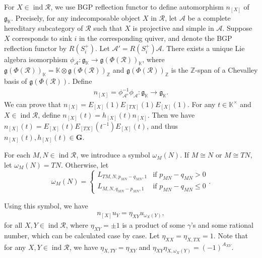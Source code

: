 \documentclass[12pt]{amsart}
\begin{document}
For $X\in \operatorname{ind}\mathcal{R}$, we use BGP reflection functor to define automorphism $n_{[X]}$ of $\mathfrak{g}_{\mathbb{K}}$. 
Precisely, for any indecomposable object $X$ in $\mathcal{R}$, let $\mathcal{A}$ be a complete hereditary subcategory of $\mathcal{R}$ such that $X$ is projective and simple in $\mathcal{A}$.
Suppose $X$ corresponds to sink $i$ in the corresponding quiver, and denote the BGP reflection functor by $R(S_i^+)$.
Let $\mathcal{A}'=R(S_i^+)\mathcal{A}$.
There exists a unique Lie algebra isomorphism $\phi_{\mathcal{A}}:\mathfrak{g}_{\mathbb{K}}\rightarrow \mathfrak{g}(\Phi(\mathcal{R}))_{\mathbb{K}}$, where $\mathfrak{g}(\Phi(\mathcal{R}))_{\mathbb{K}}=\mathbb{K}\otimes \mathfrak{g}(\Phi(\mathcal{R}))_{\mathbb{Z}}$ and $\mathfrak{g}(\Phi(\mathcal{R}))_{\mathbb{Z}}$ is the $\mathbb{Z}$-span of a Chevalley basis of $\mathfrak{g}(\Phi(\mathcal{R}))$.
Define
\begin{align*}
    n_{[X]}=\phi_{\mathcal{A}'}^{-1}\phi_{\mathcal{A}}:\mathfrak{g}_{\mathbb{K}}\rightarrow \mathfrak{g}_{\mathbb{K}}.
\end{align*}
We can prove that $n_{[X]}=E_{[X]}(1)E_{[TX]}(1)E_{[X]}(1)$.
For any $t\in \mathbb{K}^{\times}$ and $X\in \operatorname{ind}\mathcal{R}$, define $n_{[X]}(t)=h_{[X]}(t)n_{[X]}$. Then we have $n_{[X]}(t)=E_{[X]}(t) E_{[TX]}(t^{-1}) E_{[X]}(t)$, and thus $n_{[X]}(t),h_{[X]}(t)\in \mathbf{G}$.

For each $M,N\in \operatorname{ind}\mathcal{R}$, we introduce a symbol $\omega_M(N)$. 
If $M\cong N$ or $M\cong TN$, let $\omega_M(N)=TN$.
Otherwise, let 
\begin{equation*}
    \omega_M(N) = 
    \begin{cases}
        L_{TM,N,p_{MN}-q_{MN},1}  &  \text{if } p_{MN}-q_{MN} >0 \\
        L_{M,N,q_{MN}-p_{MN},1}  &  \text{if } p_{MN}-q_{MN} \leqslant 0
    \end{cases}
    .
\end{equation*}

Using this symbol, we have
\begin{align*}
    n_{[X]}u_Y=\eta_{XY}u_{\omega_X(Y)},
\end{align*}
for all $X,Y\in \operatorname{ind}\mathcal{R}$, where $\eta_{XY}=\pm 1$ is a product of some $\gamma$'s and some rational number, which can be calculated case by case.
Let $\eta_{XX}=\eta_{X,TX}=1$.
Note that for any $X,Y\in \operatorname{ind}\mathcal{R}$, we have $\eta_{X,TY}=\eta_{XY}$ and $\eta_{XY}\eta_{X,\omega_X(Y)}=(-1)^{A_{XY}}$.
 
\end{document}
